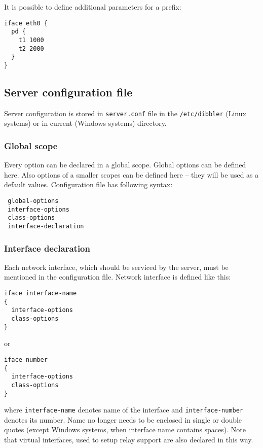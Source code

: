 It is possible to define additional parameters for a prefix:

\begin{lstlisting}
iface eth0 {
  pd {
    t1 1000
    t2 2000
  }
}
\end{lstlisting}

\subsection{Server configuration file}

Server configuration is stored in \verb+server.conf+ file in the
\verb+/etc/dibbler+ (Linux systems) or in current (Windows systems)
directory. 

\subsubsection{Global scope}

Every option can be declared in a global scope. Global options can be
defined here. Also options of a smaller scopes can be defined here --
they will be used as a default values. Configuration file has following syntax:

\begin{verbatim}
 global-options
 interface-options
 class-options          
 interface-declaration
\end{verbatim}

\subsubsection{Interface declaration}
Each network interface, which should be serviced by the server, must be
mentioned in the configuration file. Network interface is defined like this:
\begin{verbatim}
iface interface-name
{
  interface-options
  class-options        
}
\end{verbatim}

or 

\begin{verbatim}
iface number 
{
  interface-options
  class-options        
}
\end{verbatim}

where \verb+interface-name+ denotes name of the interface and
\verb+interface-number+ denotes its number. Name no longer needs to be
enclosed in single or double quotes (except Windows systems, when
interface name contains spaces). Note that virtual interfaces, used
to setup relay support are also declared in this way.

